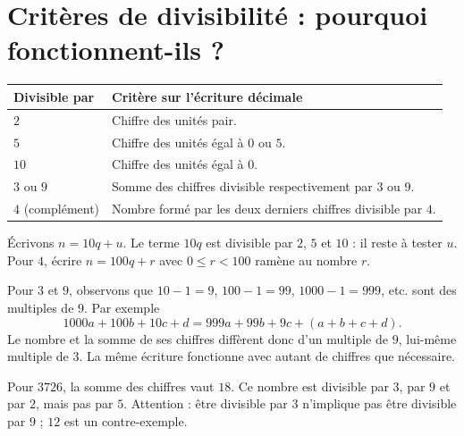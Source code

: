 \documentclass[../cours_3e.tex]{subfiles}
\begin{document}
\section{Critères de divisibilité : pourquoi fonctionnent-ils ?}
\begin{center}
\begin{tabularx}{\textwidth}{lX}
\toprule Divisible par & Critère sur l'écriture décimale\\\midrule
$2$ & Chiffre des unités pair.\\
$5$ & Chiffre des unités égal à $0$ ou $5$.\\
$10$ & Chiffre des unités égal à $0$.\\
$3$ ou $9$ & Somme des chiffres divisible respectivement par $3$ ou $9$.\\
$4$ (complément) & Nombre formé par les deux derniers chiffres divisible par $4$.\\
\bottomrule
\end{tabularx}
\end{center}
\begin{demonstration}
Écrivons $n=10q+u$. Le terme $10q$ est divisible par $2$, $5$ et $10$ : il reste à tester $u$. Pour $4$, écrire $n=100q+r$ avec $0\leq r<100$ ramène au nombre $r$.

Pour $3$ et $9$, observons que $10-1=9$, $100-1=99$, $1000-1=999$, etc. sont des multiples de $9$. Par exemple
\[1000a+100b+10c+d=999a+99b+9c+(a+b+c+d).\]
Le nombre et la somme de ses chiffres diffèrent donc d'un multiple de $9$, lui-même multiple de $3$. La même écriture fonctionne avec autant de chiffres que nécessaire.
\end{demonstration}
\begin{exemple}
Pour $3726$, la somme des chiffres vaut $18$. Ce nombre est divisible par $3$, par $9$ et par $2$, mais pas par $5$. Attention : être divisible par $3$ n'implique pas être divisible par $9$ ; $12$ est un contre-exemple.
\end{exemple}
\end{document}
